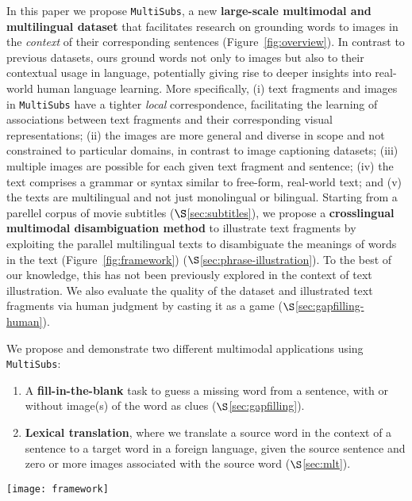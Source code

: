 \documentclass[twocolumn]{svjour3}          \smartqed  \usepackage{graphicx}
\newcommand{\multisubs}{\texttt{MultiSubs}\xspace}
\begin{document}
In this paper we propose \multisubs, a new \textbf{large-scale multimodal and multilingual dataset} that facilitates research on grounding words to images in the \emph{context} of their corresponding sentences (Figure~\ref{fig:overview}). In contrast to previous datasets, ours ground words not only to images but also to their contextual usage in language, potentially giving rise to deeper insights into real-world human language learning. More specifically, (i) text fragments and images in \multisubs have a tighter \emph{local} correspondence, facilitating the learning of associations between text fragments and their corresponding visual representations; (ii) the images are more general and diverse in scope and not constrained to particular domains, in contrast to image captioning datasets; (iii) multiple images are possible for each given text fragment and sentence; (iv) the text comprises a grammar or syntax similar to free-form, real-world text; and (v) the texts are multilingual and not just monolingual or bilingual. Starting from a parellel corpus of movie subtitles ($\S$\ref{sec:subtitles}), we propose a \textbf{crosslingual multimodal disambiguation method} to illustrate text fragments by exploiting the parallel multilingual texts to disambiguate the meanings of words in the text (Figure~\ref{fig:framework})  ($\S$\ref{sec:phrase-illustration}). To the best of our knowledge, this has not been previously explored in the context of text illustration. We also evaluate the quality of the dataset and illustrated text fragments via human judgment by casting it as a game ($\S$\ref{sec:gapfilling-human}).

We propose and demonstrate two different multimodal applications using \multisubs:
\begin{enumerate}
\item A \textbf{fill-in-the-blank} task to guess a missing word from a sentence, with or without image(s) of the word as clues ($\S$\ref{sec:gapfilling}). \item \textbf{Lexical translation}, where we translate a source word in the context of a sentence to a target word in a foreign language, given the source sentence and zero or more images associated with the source word ($\S$\ref{sec:mlt}). 
\end{enumerate}

\begin{figure*}[t]
    \centering
    \texttt{[image: framework]}
    \caption{Overview of the \multisubs construction process. Starting from parallel corpora, we selected `visually salient' English words  (\textit{weapon} and \textit{trunk} in this example). We automatically align the words across languages (e.g.\ \textit{trunk} to \textit{cajuela}, \textit{coffre} etc.), and queried BabelNet with the words to obtain a list of synsets. In this example, \textit{trunk} in English is ambiguous, but \textit{cajuela} in Spanish is not. We thus disambiguated the sense of \textit{trunk} by finding the intersection of synsets across languages (bn:00007381n), and illustrate \textit{trunk} with images associated with the intersecting synset, as provided by BabelNet.}
    \label{fig:framework}
\end{figure*}
\end{document}
